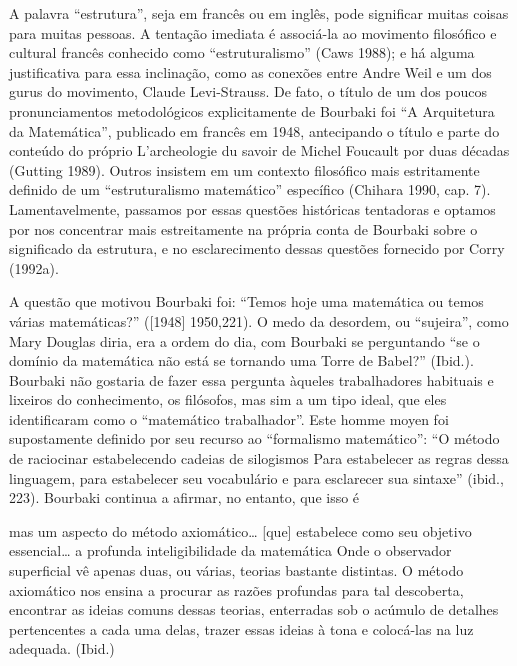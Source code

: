 \documentclass[a4paper,12pt]{article}[abntex2]
\begin{document}
A palavra “estrutura”, seja em francês ou em inglês, pode significar muitas coisas para muitas pessoas. A tentação imediata é associá-la ao movimento filosófico e cultural francês conhecido como “estruturalismo” (Caws 1988); e há alguma justificativa para essa inclinação, como as conexões entre Andre Weil e um dos gurus do movimento, Claude Levi-Strauss. De fato, o título de um dos poucos pronunciamentos metodológicos explicitamente de Bourbaki foi “A Arquitetura da Matemática”, publicado em francês em 1948, antecipando o título e parte do conteúdo do próprio L’archeologie du savoir de Michel Foucault por duas décadas (Gutting 1989). Outros insistem em um contexto filosófico mais estritamente definido de um “estruturalismo matemático” específico (Chihara 1990, cap. 7). Lamentavelmente, passamos por essas questões históricas tentadoras e optamos por nos concentrar mais estreitamente na própria conta de Bourbaki sobre o significado da estrutura, e no esclarecimento dessas questões fornecido por Corry (1992a).

A questão que motivou Bourbaki foi: “Temos hoje uma matemática ou temos várias matemáticas?” ([1948] 1950,221). O medo da desordem, ou “sujeira”, como Mary Douglas diria, era a ordem do dia, com Bourbaki se perguntando “se o domínio da matemática não está se tornando uma Torre de Babel?” (Ibid.). Bourbaki não gostaria de fazer essa pergunta àqueles trabalhadores habituais e lixeiros do conhecimento, os filósofos, mas sim a um tipo ideal, que eles identificaram como o “matemático trabalhador”. Este homme moyen foi supostamente definido por seu recurso ao “formalismo matemático”: “O método de raciocinar estabelecendo cadeias de silogismos Para estabelecer as regras dessa linguagem, para estabelecer seu vocabulário e para esclarecer sua sintaxe” (ibid., 223). Bourbaki continua a afirmar, no entanto, que isso é

mas um aspecto do método axiomático… [que] estabelece como seu objetivo essencial… a profunda inteligibilidade da matemática Onde o observador superficial vê apenas duas, ou várias, teorias bastante distintas. O método axiomático nos ensina a procurar as razões profundas para tal descoberta, encontrar as ideias comuns dessas teorias, enterradas sob o acúmulo de detalhes pertencentes a cada uma delas, trazer essas ideias à tona e colocá-las na luz adequada. (Ibid.)
\end{document}
